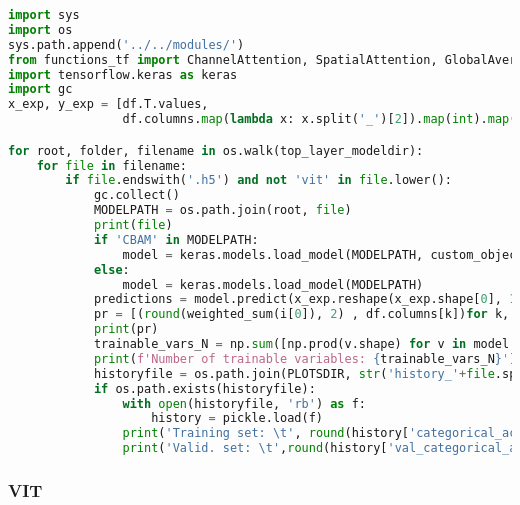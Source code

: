 \begin{lstlisting}[language=Python]
import sys
import os
sys.path.append('../../modules/')
from functions_tf import ChannelAttention, SpatialAttention, GlobalAveragePooling1D
import tensorflow.keras as keras
import gc
x_exp, y_exp = [df.T.values,
                df.columns.map(lambda x: x.split('_')[2]).map(int).map(angstrom_to_label)]

for root, folder, filename in os.walk(top_layer_modeldir):
    for file in filename:
        if file.endswith('.h5') and not 'vit' in file.lower():
            gc.collect()
            MODELPATH = os.path.join(root, file)
            print(file)
            if 'CBAM' in MODELPATH:
                model = keras.models.load_model(MODELPATH, custom_objects={'ChannelAttention': ChannelAttention, 'SpatialAttention': SpatialAttention, 'CBAM': functions_tf.CBAM})
            else:
                model = keras.models.load_model(MODELPATH)
            predictions = model.predict(x_exp.reshape(x_exp.shape[0], 1, 1024))
            pr = [(round(weighted_sum(i[0]), 2) , df.columns[k])for k, i in enumerate(predictions)]
            print(pr)
            trainable_vars_N = np.sum([np.prod(v.shape) for v in model.trainable_variables])
            print(f'Number of trainable variables: {trainable_vars_N}')
            historyfile = os.path.join(PLOTSDIR, str('history_'+file.split('.')[0]+'.pkl'))
            if os.path.exists(historyfile):
                with open(historyfile, 'rb') as f:
                    history = pickle.load(f)
                print('Training set: \t', round(history['categorical_accuracy'][-1]*100, 2), '%')
                print('Valid. set: \t',round(history['val_categorical_accuracy'][-1]*100, 2), '%')
\end{lstlisting}


\hypertarget{vit}{%
\subsubsection*{VIT}\label{vit}}


